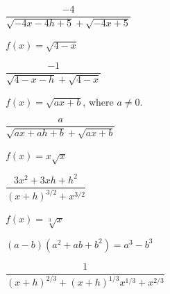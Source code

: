 \documentclass{ximera}
\begin{document}
\begin{question}
\begin{problem}
\begin{solution}
    $\dfrac{-4}{\sqrt{-4x-4h+5} + \sqrt{-4x+5}}$
\end{solution}
\end{problem}

\begin{problem}
$f(x) = \sqrt{4-x}$ 

\begin{solution}
    $\dfrac{-1}{\sqrt{4-x-h} + \sqrt{4-x}}$
\end{solution}
\end{problem}

\begin{problem}
$f(x) = \sqrt{ax+b}$, where $a \neq 0$.

\begin{solution}
    $\dfrac{a}{\sqrt{ax+ah+b} + \sqrt{ax+b}}$
\end{solution}
\end{problem}

\begin{problem}
$f(x) = x \sqrt{x}$

\begin{solution}
    $\dfrac{3x^2+3xh+h^2}{(x+h)^{3/2} + x^{3/2}}$
\end{solution}
\end{problem}

\begin{problem}\label{diffquotexerlast}
$f(x) = \sqrt[3]{x}$

\begin{hint}
$(a-b)\left(a^2+ab+b^2\right) = a^3 - b^3$
\end{hint}

\begin{solution}
    $\dfrac{1}{(x+h)^{2/3} + (x+h)^{1/3} x^{1/3} + x^{2/3}}$
\end{solution}
\end{problem}
  

\end{question}
\end{document}

